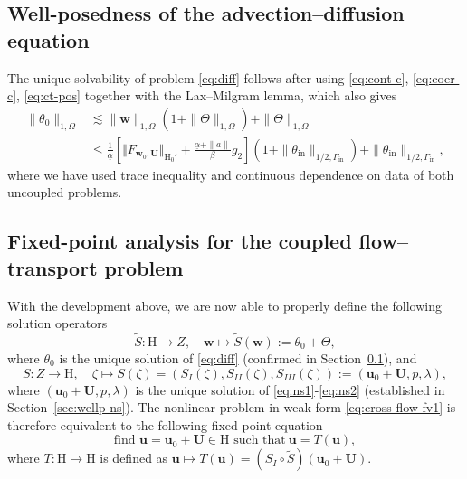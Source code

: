 \documentclass[onefignum,onetabnum,reqno,a4paper,final]{siamart250211}
\newcommand\bu{\boldsymbol{u}}
\newcommand\bw{\boldsymbol{w}}
\newcommand\0{\mathbf{0}}
\newcommand\bU{\boldsymbol{U}}
\newcommand\bH{\boldsymbol{\mathrm{H}}}
\newcommand\Gi{\Gamma_{\mathrm{in}}}
\numberwithin{figure}{section}
\numberwithin{table}{section}
\begin{document}
 
	\subsection{Well-posedness of the advection--diffusion equation}\label{sec:wellp-ad}
	The unique solvability of problem \eqref{eq:diff} follows after using \eqref{eq:cont-c}, \eqref{eq:coer-c}, \eqref{eq:ct-pos} together with the Lax--Milgram lemma, which also gives  
	\begin{align}
		\label{eq:bound-}
		\|\theta_0\|_{1,\Omega} & \lesssim \|\bw\|_{1,\Omega}(1 + \|\Theta\|_{1,\Omega}) +  \|\Theta\|_{1,\Omega} \nonumber \\
  & \leq \frac{1}{\underline{\alpha}}\left[\Vert F_{\bw_0,\bU}\Vert_{\bH_0'} +\frac{\underline{\alpha}+\|a\|}{\beta}g_2\right] (1 + \|\theta_{\mathrm{in}}\|_{1/2,\Gi}) + \|\theta_{\mathrm{in}}\|_{1/2,\Gi},
	\end{align} 
	where we have used trace inequality and continuous dependence on data of both uncoupled problems. 
	
	\subsection{Fixed-point analysis for the coupled flow--transport problem}\label{sec:fixed-point}
	With the development above, we are now able to properly define the following solution operators 
	\[\tilde{S}: \bH \to Z, \quad \bw \mapsto \tilde{S}(\bw) := \theta_0 + \Theta, \]
	where $\theta_0$ is the unique solution of \eqref{eq:diff} (confirmed in Section~\ref{sec:wellp-ad}), and 
	\[S: Z \to \bH, \quad \zeta \mapsto S(\zeta) = (S_I(\zeta),S_{I\!I}(\zeta),S_{I\!I\!I}(\zeta)):= (\bu_0+\bU,p,\lambda), \]
	where $(\bu_0+\bU,p,\lambda)$ is the unique solution of \eqref{eq:ns1}-\eqref{eq:ns2} (established in Section~\ref{sec:wellp-ns}). 
	The nonlinear problem in weak form \eqref{eq:cross-flow-fv1} is therefore equivalent to the following fixed-point equation
	\begin{equation}
		\text{find $\bu= \bu_0 + \bU \in \bH$ such that} \   \bu = T(\bu),    \label{eq:fixed-point}
	\end{equation}
	where $T:\bH\to \bH$ is defined as $\bu \mapsto T(\bu) = ({S}_I\circ \tilde{S})(\bu_0 + \bU)$. 
	
\end{document}

